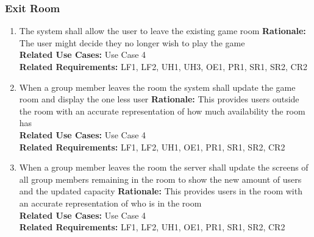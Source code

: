 \documentclass[12pt]{article}
\begin{document}
\subsubsection{Exit Room}
\begin{enumerate}[label=ER\arabic*., series=ExitRoom]
    \item The system shall allow the user to leave the existing game room\newline 
    \textbf{Rationale:} The user might decide they no longer wish to play the game\\
    \textbf{Related Use Cases:} Use Case 4\\
    \textbf{Related Requirements:} LF1, LF2, UH1, UH3, OE1, PR1, SR1, SR2, CR2
    \item When a group member leaves the room the system shall update the game room and display the one less user\newline 
    \textbf{Rationale:} This provides users outside the room with an accurate representation of how much availability the room has\\
    \textbf{Related Use Cases:} Use Case 4\\
    \textbf{Related Requirements:} LF1, LF2, UH1, OE1, PR1, SR1, SR2, CR2
    \item When a group member leaves the room the server shall update the screens of all group members remaining in the room to show the new amount of users and the updated capacity\newline 
    \textbf{Rationale:} This provides users in the room with an accurate representation of who is in the room\\
    \textbf{Related Use Cases:} Use Case 4\\
    \textbf{Related Requirements:} LF1, LF2, UH1, OE1, PR1, SR1, SR2, CR2
\end{enumerate}
\end{document}

